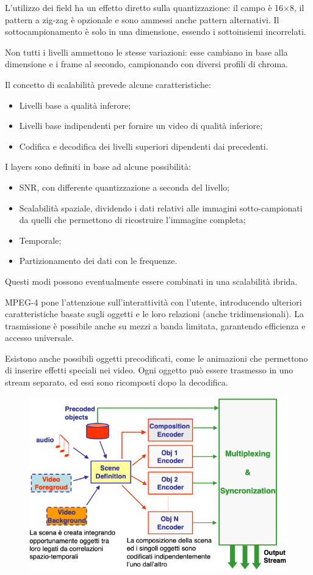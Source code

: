 L'utilizzo dei field ha un effetto diretto sulla quantizzazione: il campo è 16$\times$8, il pattern a zig-zag è opzionale e sono ammessi anche pattern alternativi. Il sottocampionamento è solo in una dimensione, essendo i sottoinsiemi incorrelati. 

Non tutti i livelli ammettono le stesse variazioni: esse cambiano in base alla dimensione e i frame al secondo, campionando con diversi profili di chroma. 

Il concetto di scalabilità prevede alcune caratteristiche:
\begin{itemize}
	\item Livelli base a qualità inferore;
	\item Livelli base indipendenti per fornire un video di qualità inferiore;
	\item Codifica e decodifica dei livelli superiori dipendenti dai precedenti.
\end{itemize}

I layers sono definiti in base ad alcune possibilità:
\begin{itemize}
	\item SNR, con differente quantizzazione a seconda del livello;
	\item Scalabilità spaziale, dividendo i dati relativi alle immagini sotto-campionati da quelli che permettono di ricostruire l'immagine completa;
	\item Temporale;
	\item Partizionamento dei dati con le frequenze.
\end{itemize}
Questi modi possono eventualmente essere combinati in una scalabilità ibrida.

MPEG-4 pone l'attenzione sull'interattività con l'utente, introducendo ulteriori caratteristiche basate sugli oggetti e le loro relazioni (anche tridimensionali). La trasmissione è possibile anche su mezzi a banda limitata, garantendo efficienza e accesso universale.

Esistono anche possibili oggetti precodificati, come le animazioni che permettono di inserire effetti speciali nei video. Ogni oggetto può essere trasmesso in uno stream separato, ed essi sono ricomposti dopo la decodifica.

\begin{figure}[h]
	\centering
	\includegraphics[scale=0.6]{Lezioni/Immagini/mpeg-4}
\end{figure}


